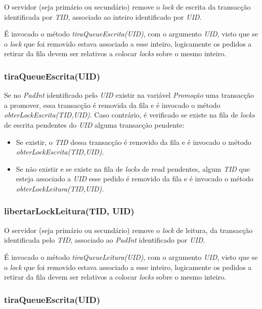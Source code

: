 O servidor (seja primário ou secundário) remove o \textit{lock} de escrita da transacção identificada por \textit{TID}, associado ao inteiro identificado por \textit{UID}.

É invocado o método \textit{tiraQueueEscrita(UID)}, com o argumento \textit{UID}, visto que se o \textit{lock} que foi removido estava associado a esse inteiro, logicamente os pedidos a retirar da fila devem ser relativos a colocar \textit{locks} sobre o mesmo inteiro.

\subsubsection{tiraQueueEscrita(UID)}

Se no \textit{PadInt} identificado pelo \textit{UID} existir na variável \textit{Promoção} uma transacção a promover, essa transacção é removida da fila e é invocado o método \textit{obterLockEscrita(TID,UID)}. Caso contrário, é verificado se existe na fila de \textit{locks} de escrita pendentes do \textit{UID} alguma transacção pendente:
\begin{itemize}
	\item Se existir, o \textit{TID} dessa transacção é removido da fila e é invocado o método \textit{obterLockEscrita(TID,UID)}. 
	\item Se não existir e se existe na fila de \textit{locks} de read pendentes, algum \textit{TID}  que esteja associado a \textit{UID} esse pedido é removido da fila e é invocado o método \textit{obterLockLeitura(TID,UID)}.
\end{itemize}

\subsubsection{libertarLockLeitura(TID, UID)}

O servidor (seja primário ou secundário) remove o \textit{lock} de leitura, da transacção identificada pelo \textit{TID}, associado ao \textit{PadInt} identificado por \textit{UID}.

É invocado o método \textit{tiraQueueLeitura(UID)}, com o argumento \textit{UID}, visto que se o \textit{lock} que foi removido estava associado a esse inteiro, logicamente os pedidos a retirar da fila devem ser relativos a colocar \textit{locks} sobre o mesmo inteiro.

\subsubsection{tiraQueueEscrita(UID)}

